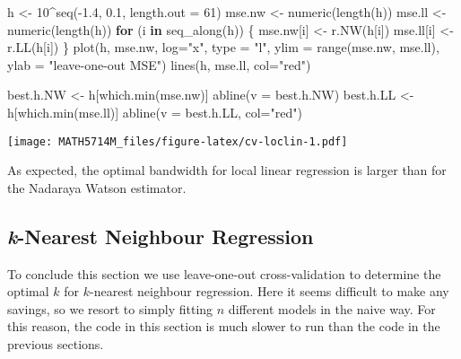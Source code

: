\documentclass[
  a4paper,
]{article}
\newenvironment{Shaded}{\begin{snugshade}}{\end{snugshade}}
\newcommand{\AttributeTok}[1]{\textcolor[rgb]{0.77,0.63,0.00}{#1}}
\newcommand{\ControlFlowTok}[1]{\textcolor[rgb]{0.13,0.29,0.53}{\textbf{#1}}}
\newcommand{\DecValTok}[1]{\textcolor[rgb]{0.00,0.00,0.81}{#1}}
\newcommand{\FloatTok}[1]{\textcolor[rgb]{0.00,0.00,0.81}{#1}}
\newcommand{\FunctionTok}[1]{\textcolor[rgb]{0.00,0.00,0.00}{#1}}
\newcommand{\NormalTok}[1]{#1}
\newcommand{\OtherTok}[1]{\textcolor[rgb]{0.56,0.35,0.01}{#1}}
\newcommand{\SpecialCharTok}[1]{\textcolor[rgb]{0.00,0.00,0.00}{#1}}
\newcommand{\StringTok}[1]{\textcolor[rgb]{0.31,0.60,0.02}{#1}}
\theoremstyle{definition}
\theoremstyle{definition}
\theoremstyle{definition}
\theoremstyle{definition}
\theoremstyle{remark}
\begin{document}
\begin{Shaded}
\begin{Highlighting}[]
\NormalTok{h }\OtherTok{\textless{}{-}} \DecValTok{10}\SpecialCharTok{\^{}}\FunctionTok{seq}\NormalTok{(}\SpecialCharTok{{-}}\FloatTok{1.4}\NormalTok{, }\FloatTok{0.1}\NormalTok{, }\AttributeTok{length.out =} \DecValTok{61}\NormalTok{)}
\NormalTok{mse.nw }\OtherTok{\textless{}{-}} \FunctionTok{numeric}\NormalTok{(}\FunctionTok{length}\NormalTok{(h))}
\NormalTok{mse.ll }\OtherTok{\textless{}{-}} \FunctionTok{numeric}\NormalTok{(}\FunctionTok{length}\NormalTok{(h))}
\ControlFlowTok{for}\NormalTok{ (i }\ControlFlowTok{in} \FunctionTok{seq\_along}\NormalTok{(h)) \{}
\NormalTok{    mse.nw[i] }\OtherTok{\textless{}{-}} \FunctionTok{r.NW}\NormalTok{(h[i])}
\NormalTok{    mse.ll[i] }\OtherTok{\textless{}{-}} \FunctionTok{r.LL}\NormalTok{(h[i])}
\NormalTok{\}}
\FunctionTok{plot}\NormalTok{(h, mse.nw, }\AttributeTok{log=}\StringTok{"x"}\NormalTok{, }\AttributeTok{type =} \StringTok{"l"}\NormalTok{, }\AttributeTok{ylim =} \FunctionTok{range}\NormalTok{(mse.nw, mse.ll),}
     \AttributeTok{ylab =} \StringTok{"leave{-}one{-}out MSE"}\NormalTok{)}
\FunctionTok{lines}\NormalTok{(h, mse.ll, }\AttributeTok{col=}\StringTok{"red"}\NormalTok{)}

\NormalTok{best.h.NW }\OtherTok{\textless{}{-}}\NormalTok{ h[}\FunctionTok{which.min}\NormalTok{(mse.nw)]}
\FunctionTok{abline}\NormalTok{(}\AttributeTok{v =}\NormalTok{ best.h.NW)}
\NormalTok{best.h.LL }\OtherTok{\textless{}{-}}\NormalTok{ h[}\FunctionTok{which.min}\NormalTok{(mse.ll)]}
\FunctionTok{abline}\NormalTok{(}\AttributeTok{v =}\NormalTok{ best.h.LL, }\AttributeTok{col=}\StringTok{"red"}\NormalTok{)}
\end{Highlighting}
\end{Shaded}

\texttt{[image: MATH5714M\_files/figure-latex/cv-loclin-1.pdf]}

As expected, the optimal bandwidth for local linear regression is
larger than for the Nadaraya Watson estimator.

\hypertarget{k-nearest-neighbour-regression}{%
\subsection{\texorpdfstring{\emph{k}-Nearest Neighbour Regression}{k-Nearest Neighbour Regression}}\label{k-nearest-neighbour-regression}}

To conclude this section we use leave-one-out cross-validation to determine the
optimal \(k\) for \(k\)-nearest neighbour regression. Here it seems difficult to
make any savings, so we resort to simply fitting \(n\) different models in the
naive way. For this reason, the code in this section is much slower to
run than the code in the previous sections.
\end{document}
